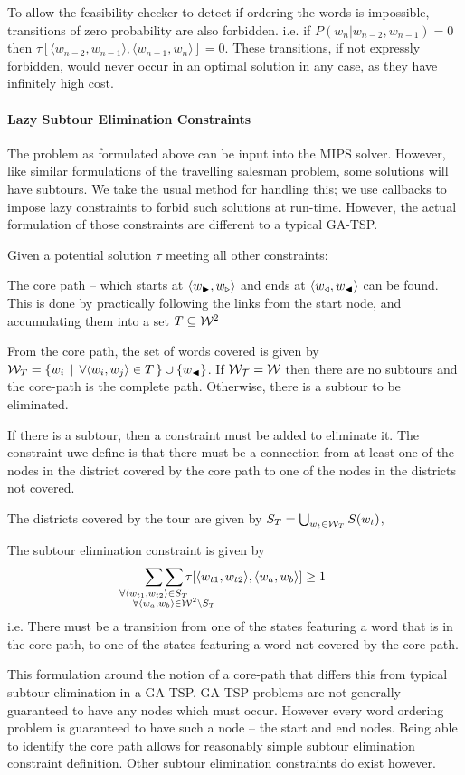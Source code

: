 \documentclass[twocolumn]{article}
\begin{document}
To allow the feasibility checker to detect if ordering the words is
impossible, transitions of zero probability are also forbidden. i.e. if \mbox{$P(w_{n}|w_{n-2},w_{n-1})=0$} then \mbox{$\tau[\langle w_{n-2},w_{n-1}\rangle,\langle w_{n-1},w_{n}\rangle]=0$}.
These transitions, if not expressly forbidden, would never occur in
an optimal solution in any case, as they have infinitely high cost.


\paragraph{Lazy Subtour Elimination Constraints}

The problem as formulated above can be input into the MIPS solver. However, like similar formulations of the
travelling salesman problem, some solutions will have subtours.
We take the usual method for handling this; we use callbacks to impose
lazy constraints to forbid such solutions at run-time.  
However, the actual formulation of those constraints are different to a typical GA-TSP.

Given a potential solution $\tau$ meeting all other constraints:

The core path -- which starts at $\langle w_{\blacktriangleright},w_{\triangleright}\rangle$
and ends at $\langle w_{\triangleleft},w_{\blacktriangleleft}\rangle$ can be found. This is done
by practically following the links from the start node, and accumulating
them into a set $T\subseteq\mathcal{W}^{2}$

From the core path, the set of words covered is given by $\mathcal{W}_{T}=\{w_{i}\,\mid\,\forall\langle w_{i},w_{j}\rangle\in T\,\}\cup\{w_{\blacktriangleleft}\}$.
If $\mathcal{W_{T}}=\mathcal{W}$ then there are no subtours and the core-path
is the complete path. Otherwise, there is a subtour to be eliminated.

If there is a subtour, then a constraint must be
added to eliminate it. The constraint uwe define is that there must be a connection from at least one of the nodes in the district covered by the core path to
one of the nodes in the districts not covered.

The districts covered by the tour are given by $S_{T}=\bigcup_{w_{t}\in \mathcal{W}_{T}}S(w_{t})$,

The subtour elimination constraint is given by 
\displayunskip
\begin{equation*}
  \sum_{\mathclap{\forall\langle w_{t1},w_{t2}\rangle\in S_{T}}}
  \sum_{\mathclap{\substack{\; \\ \;\\ \forall\langle w_{a},w_{b}\rangle\in\W^{2}\backslash S_{T}}}}
  \tau[\langle w_{t1},w_{t2}\rangle,\langle w_{a},w_{b}\rangle]\ge1
\end{equation*}
i.e. There must be a transition from one of the states featuring a
word that is in the core path, to one of the states featuring a word
not covered by the core path.


This formulation around the notion of a core-path that differs this from typical subtour elimination in a GA-TSP. GA-TSP problems are not generally guaranteed to have any nodes which must occur. However every word ordering problem is guaranteed to have such a node -- the start and end nodes. Being able to identify the core path allows for reasonably simple subtour elimination constraint definition. Other subtour elimination constraints do exist however.
\end{document}
